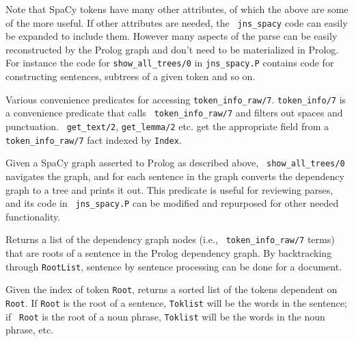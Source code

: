 \begin{description}
Note that SpaCy tokens have many other attributes, of which the above
are some of the more useful.  If other attributes are needed, the {\tt
  jns\_spacy} code can easily be expanded to include them.  However
many aspects of the parse can be easily reconstructed by the Prolog
graph and don't need to be materialized in Prolog.  For instance the
code for {\tt show\_all\_trees/0} in {\tt jns\_spacy.P} contains code
for constructing sentences, subtrees of a given token and so on.

%
Various convenience predicates for accessing {\tt token\_info\_raw/7}.
{\tt token\_info/7} is a convenience predicate that calls {\tt
  token\_info\_raw/7} and filters out spaces and punctuation.  {\tt
  get\_text/2}, {\tt get\_lemma/2} etc. get the appropriate field from
a {\tt token\_info\_raw/7} fact indexed by {\tt Index}.
  
%
  Given a SpaCy graph asserted to Prolog as described above, {\tt
    show\_all\_trees/0} navigates the graph, and for each sentence in
  the graph converts the dependency graph to a tree and prints it out.
  This predicate is useful for reviewing parses, and its code in {\tt
    jns\_spacy.P} can be modified and repurposed for other needed
  functionality.

%
Returns a list of the dependency graph nodes (i.e., {\tt
  token\_info\_raw/7} terms) that are roots of a sentence in the
Prolog dependency graph.  By backtracking through {\tt RootList},
sentence by sentence processing can be done for a document.

%
Given the index of token {\tt Root}, returns a sorted list of the
tokens dependent on {\tt Root}.  If {\tt Root} is the root of a
sentence, {\tt Toklist} will be the words in the sentence; if {\tt
  Root} is the root of a noun phrase, {\tt Toklist} will be the words
in the noun phrase, etc.

\end{description}  

